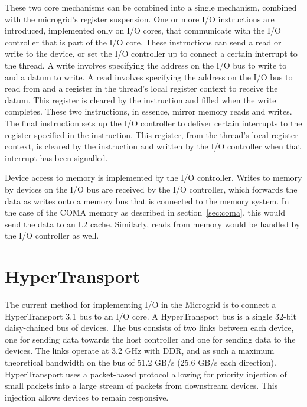 These two core mechanisms can be combined into a single mechanism, combined with the microgrid's register suspension. One or more I/O instructions are introduced, implemented only on I/O cores, that communicate with the I/O controller that is part of the I/O core. These instructions can send a read or write to the device, or set the I/O controller up to connect a certain interrupt to the thread. A write involves specifying the address on the I/O bus to write to and a datum to write. A read involves specifying the address on the I/O bus to read from and a register in the thread's local register context to receive the datum. This register is cleared by the instruction and filled when the write completes. These two instructions, in essence, mirror memory reads and writes. The final instruction sets up the I/O controller to deliver certain interrupts to the register specified in the instruction. This register, from the thread's local register context, is cleared by the instruction and written by the I/O controller when that interrupt has been signalled.

Device access to memory is implemented by the I/O controller. Writes to memory by devices on the I/O bus are received by the I/O controller, which forwards the data as writes onto a memory bus that is connected to the memory system. In the case of the COMA memory as described in section~\ref{sec:coma}, this would send the data to an L2 cache. Similarly, reads from memory would be handled by the I/O controller as well.

\section{HyperTransport}
The current method for implementing I/O in the Microgrid is to connect a HyperTransport 3.1\cite{hypertransport} bus to an I/O core. A HyperTransport bus is a single 32-bit daisy-chained bus of devices. The bus consists of two links between each device, one for sending data towards the host controller and one for sending data to the devices. The links operate at 3.2 GHz with DDR, and as such a maximum theoretical bandwidth on the bus of 51.2 GB/s (25.6 GB/s each direction). HyperTransport uses a packet-based protocol allowing for priority injection of small packets into a large stream of packets from downstream devices. This injection allows devices to remain responsive.